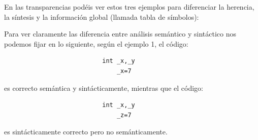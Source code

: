 \documentclass{apuntes}
\begin{document}
En las transparencias podéis ver estos tres ejemplos para diferenciar la herencia, la síntesis y la información global (llamada tabla de símbolos):









\begin{example}
Para ver claramente las diferencia entre análisis semántico y sintáctico nos podemos fijar en lo siguiente, según el ejemplo 1, el código:
\begin{verbatim}
                           int _x,_y
                               _x=7
\end{verbatim}
es correcto semántica y sintácticamente, mientras que el código:
\begin{verbatim}
                           int _x,_y
                               _z=7
\end{verbatim}
es sintácticamente correcto pero no semánticamente.
\end{example}
\end{document}
